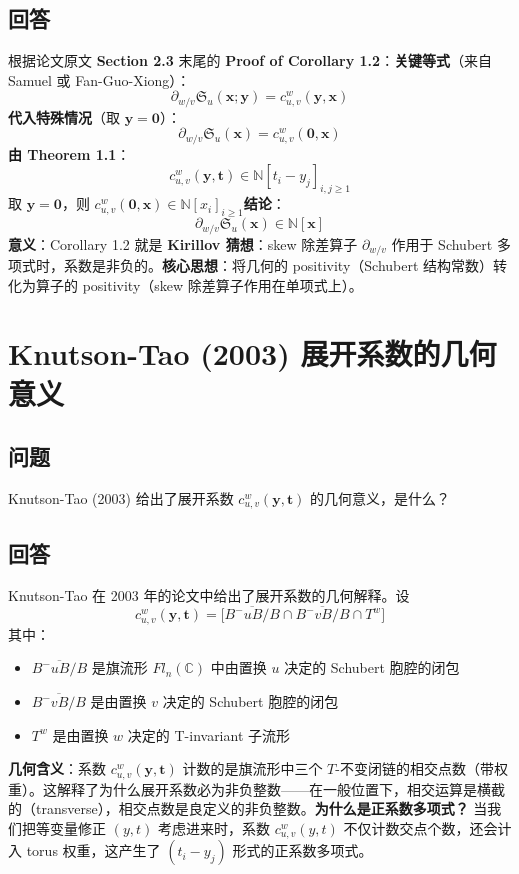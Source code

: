 \subsection{回答}
根据论文原文 \textbf{Section 2.3} 末尾的 \textbf{Proof of Corollary 1.2}：\textbf{关键等式}（来自 Samuel 或 Fan-Guo-Xiong）：$$\partial_{w / v}\mathfrak{S}_u(\mathbf{x};\mathbf{y}) = c_{u,v}^w (\mathbf{y},\mathbf{x})$$\textbf{代入特殊情况}（取 $\mathbf{y} = \mathbf{0}$）：$$\partial_{w / v}\mathfrak{S}_u(\mathbf{x}) = c_{u,v}^w(\mathbf{0}, \mathbf{x})$$\textbf{由 Theorem 1.1}：$$c_{u,v}^w(\mathbf{y}, \mathbf{t}) \in \mathbb{N}[t_i - y_j]_{i,j \geq 1}$$取 $\mathbf{y} = \mathbf{0}$，则 $c_{u,v}^w(\mathbf{0}, \mathbf{x}) \in \mathbb{N}[x_i]_{i \geq 1}$\textbf{结论}：$$\partial_{w / v}\mathfrak{S}_u(\mathbf{x}) \in \mathbb{N}[\mathbf{x}]$$\textbf{意义}：Corollary 1.2 就是 \textbf{Kirillov 猜想}：skew 除差算子 $\partial_{w/v}$ 作用于 Schubert 多项式时，系数是非负的。\textbf{核心思想}：将几何的 positivity（Schubert 结构常数）转化为算子的 positivity（skew 除差算子作用在单项式上）。
\section{Knutson-Tao (2003) 展开系数的几何意义}\label{sec:KnutsonTaoGeometricMeaning}
\subsection{问题}
Knutson-Tao (2003) 给出了展开系数 $c^w_{u,v}(\mathbf{y}, \mathbf{t})$ 的几何意义，是什么？
\subsection{回答}
Knutson-Tao 在 2003 年的论文中给出了展开系数的几何解释。设$$c^w_{u,v}(\mathbf{y}, \mathbf{t}) = \big[ \overline{B^-uB/B} \cap \overline{B^-vB/B} \cap T^w \big]$$其中：
\begin{itemize}
\item $\overline{B^-uB/B}$ 是旗流形 $Fl_n(\mathbb{C})$ 中由置换 $u$ 决定的 Schubert 胞腔的闭包
\item $\overline{B^-vB/B}$ 是由置换 $v$ 决定的 Schubert 胞腔的闭包
\item $T^w$ 是由置换 $w$ 决定的 T-invariant 子流形
\end{itemize}

\textbf{几何含义}：系数 $c^w_{u,v}(\mathbf{y}, \mathbf{t})$ 计数的是旗流形中三个 $T$-不变闭链的相交点数（带权重）。这解释了为什么展开系数必为非负整数——在一般位置下，相交运算是横截的（transverse），相交点数是良定义的非负整数。\textbf{为什么是正系数多项式？} 当我们把等变量修正 $(y, t)$ 考虑进来时，系数 $c^w_{u,v}(y,t)$ 不仅计数交点个数，还会计入 torus 权重，这产生了 $(t_i - y_j)$ 形式的正系数多项式。
